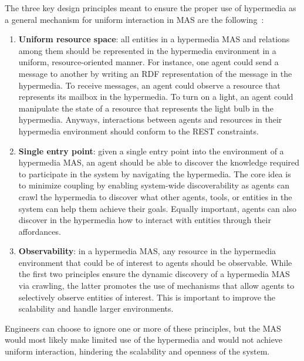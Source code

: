 The three key design principles meant to ensure the proper use of hypermedia as a general mechanism for uniform interaction in MAS are the following~\cite{10.1007/978-3-030-25693-7_15}:
\begin{enumerate}
    \item \textbf{Uniform resource space}: all entities in a hypermedia MAS and relations among them should be represented in the hypermedia environment in a uniform, resource-oriented manner.
    For instance, one agent could send a message to another by writing an RDF representation of the message in the hypermedia.
    To receive messages, an agent could observe a resource that represents its mailbox in the hypermedia.
    To turn on a light, an agent could manipulate the state of a resource that represents the light bulb in the hypermedia.
    Anyways, interactions between agents and resources in their hypermedia environment should conform to the REST constraints.
    \item \textbf{Single entry point}: given a single entry point into the environment of a hypermedia MAS, an agent should be able to discover the knowledge required to participate in the system by navigating the hypermedia.
    The core idea is to minimize coupling by enabling system-wide discoverability as agents can crawl the hypermedia to discover what other agents, tools, or entities in the system can help them achieve their goals.
    Equally important, agents can also discover in the hypermedia how to interact with entities through their affordances.
    \item \textbf{Observability}: in a hypermedia MAS, any resource in the hypermedia environment that could be of interest to agents should be observable.
    While the first two principles ensure the dynamic discovery of a hypermedia MAS via crawling, the latter promotes the use of mechanisms that allow agents to selectively observe entities of interest.
    This is important to improve the scalability and handle larger environments.
\end{enumerate}

Engineers can choose to ignore one or more of these principles, but the MAS would most likely make limited use of the hypermedia and would not achieve uniform interaction, hindering the scalability and openness of the system.

